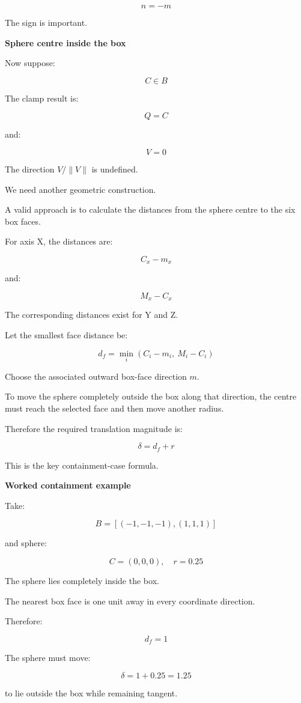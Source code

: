\[
n=-m
\]

The sign is important.

\textbf{Sphere centre inside the box}

Now suppose:

\[
C\in B
\]

The clamp result is:

\[
Q=C
\]

and:

\[
V=0
\]

The direction \(V/\|V\|\) is undefined.

We need another geometric construction.

A valid approach is to calculate the distances from the sphere centre to the six box faces.

For axis X, the distances are:

\[
C_x-m_x
\]

and:

\[
M_x-C_x
\]

The corresponding distances exist for Y and Z.

Let the smallest face distance be:

\[
\boxed{ d_f= \min_i(C_i-m_i,\ M_i-C_i) }
\]

Choose the associated outward box-face direction \(m\).

To move the sphere completely outside the box along that direction, the centre must reach the selected face and then move another radius.

Therefore the required translation magnitude is:

\[
\boxed{ \delta=d_f+r }
\]

This is the key containment-case formula.

\textbf{Worked containment example}

Take:

\[
B=[(-1,-1,-1),(1,1,1)]
\]

and sphere:

\[
C=(0,0,0),\quad r=0.25
\]

The sphere lies completely inside the box.

The nearest box face is one unit away in every coordinate direction.

Therefore:

\[
d_f=1
\]

The sphere must move:

\[
\boxed{\delta=1+0.25=1.25}
\]

to lie outside the box while remaining tangent.

